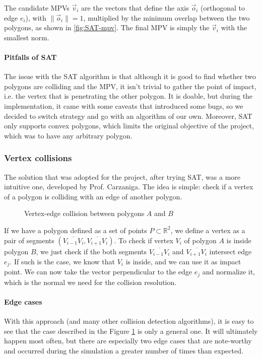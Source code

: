 The candidate MPVs $\vec v_i$ are the vectors that define the axis $\vec o_i$
(orthogonal to edge $e_i$), with $\| \vec o_i \| = 1$, multiplied by the minimum
overlap between the two polygons, as shown in \ref{fig:SAT-mpv}. The final MPV
is simply the $\vec v_i$ with the smallest norm.

\paragraph{Pitfalls of SAT} The issue with the SAT algorithm is that although it
is good to find whether two polygons are colliding and the MPV, it isn't trivial
to gather the point of impact, i.e. the vertex that is penetrating the other
polygon. It is doable, but during the implementation, it came with some caveats
that introduced some bugs, so we decided to switch strategy and go with an
algorithm of our own. Moreover, SAT only supports convex polygons, which limits
the original objective of the project, which was to have any arbitrary polygon.

\subsubsection{Vertex collisions}

The solution that was adopted for the project, after trying SAT, was a more
intuitive one, developed by Prof. Carzaniga. The idea is simple: check if a
vertex of a polygon is colliding with an edge of another polygon.

\begin{figure}[H]
	\centering
	\caption{Vertex-edge collision between polygons $A$ and $B$}
	\label{fig:vertex-edge}
\end{figure}

If we have a polygon defined as a set of points $P \subset \mathbb{R}^2$, we
define a vertex as a pair of segments $\left(\overline{V_{i-1}V_i},
	\overline{V_{i+1}V_i}\right)$. To check if vertex $V_i$ of polygon $A$ is inside
polygon $B$, we just check if the both segments $\overline{V_{i-1}V_i}$ and
$\overline{V_{i+1}V_i}$ intersect edge $e_j$. If such is the case, we know that
$V_i$ is inside, and we can use it as impact point. We can now take the vector
perpendicular to the edge $e_j$ and normalize it, which is the normal we need
for the collision resolution.


\paragraph{Edge cases} With this approach (and many other collision detection
algorithms), it is easy to see that the case described in the Figure
\ref{fig:vertex-edge} is only a general one. It will ultimately happen most
often, but there are especially two edge cases that are note-worthy and occurred
during the simulation a greater number of times than expected.

